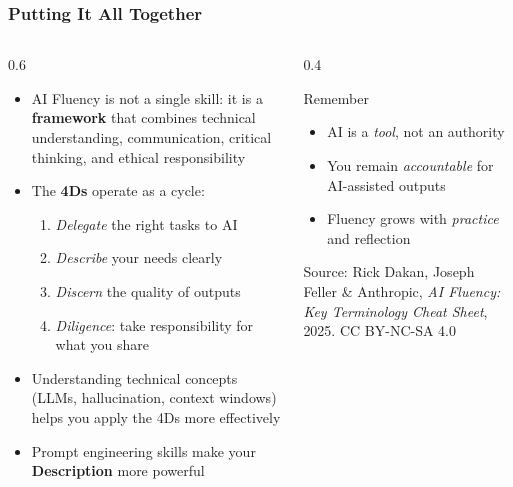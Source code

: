 \begin{frame}[fragile]\frametitle{Putting It All Together}
\begin{columns}
    \begin{column}[T]{0.6\linewidth}
      \begin{itemize}
        \item AI Fluency is not a single skill: it is a \textbf{framework} that combines technical understanding, communication, critical thinking, and ethical responsibility
        \item The \textbf{4Ds} operate as a cycle:
          \begin{enumerate}
            \item \textit{Delegate} the right tasks to AI
            \item \textit{Describe} your needs clearly
            \item \textit{Discern} the quality of outputs
            \item \textit{Diligence}: take responsibility for what you share
          \end{enumerate}
        \item Understanding technical concepts (LLMs, hallucination, context windows) helps you apply the 4Ds more effectively
        \item Prompt engineering skills make your \textbf{Description} more powerful
      \end{itemize}
    \end{column}
    \begin{column}[T]{0.4\linewidth}
      \begin{block}{Remember}
        \begin{itemize}
          \item AI is a \emph{tool}, not an authority
          \item You remain \emph{accountable} for AI-assisted outputs
          \item Fluency grows with \emph{practice} and reflection
        \end{itemize}
      \end{block}
      \vspace{0.5em}
      {\tiny Source: Rick Dakan, Joseph Feller \& Anthropic, \textit{AI Fluency: Key Terminology Cheat Sheet}, 2025. CC BY-NC-SA 4.0}
    \end{column}
  \end{columns}
\end{frame}

